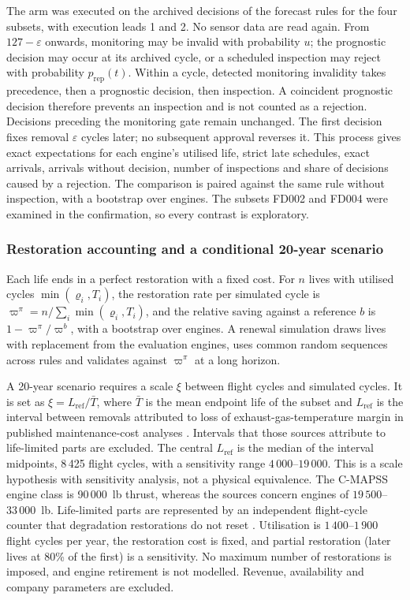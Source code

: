 \documentclass[preprint,12pt]{elsarticle}
\begin{document}
The arm was executed on the archived decisions of the forecast rules for the four subsets, with execution leads 1 and 2. No sensor data are read again. From $127-\varepsilon$ onwards, monitoring may be invalid with probability $u$; the prognostic decision may occur at its archived cycle, or a scheduled inspection may reject with probability $p_{\mathrm{rep}}(t)$. Within a cycle, detected monitoring invalidity takes precedence, then a prognostic decision, then inspection. A coincident prognostic decision therefore prevents an inspection and is not counted as a rejection. Decisions preceding the monitoring gate remain unchanged. The first decision fixes removal $\varepsilon$ cycles later; no subsequent approval reverses it. This process gives exact expectations for each engine's utilised life, strict late schedules, exact arrivals, arrivals without decision, number of inspections and share of decisions caused by a rejection. The comparison is paired against the same rule without inspection, with a bootstrap over engines. The subsets FD002 and FD004 were examined in the confirmation, so every contrast is exploratory.

\subsubsection{Restoration accounting and a conditional 20-year scenario}\label{sec:renewal-method}

Each life ends in a perfect restoration with a fixed cost. For $n$ lives with utilised cycles $\min(\varrho_i,T_i)$, the restoration rate per simulated cycle is $\varpi^{\pi}=n/\sum_i\min(\varrho_i,T_i)$, and the relative saving against a reference $b$ is $1-\varpi^{\pi}/\varpi^{b}$, with a bootstrap over engines. A renewal simulation draws lives with replacement from the evaluation engines, uses common random sequences across rules and validates against $\varpi^{\pi}$ at a long horizon.

A 20-year scenario requires a scale $\xi$ between flight cycles and simulated cycles. It is set as $\xi=L_{\mathrm{ref}}/\bar T$, where $\bar T$ is the mean endpoint life of the subset and $L_{\mathrm{ref}}$ is the interval between removals attributed to loss of exhaust-gas-temperature margin in published maintenance-cost analyses \cite{AC2003,AC2005,AC2019}. Intervals that those sources attribute to life-limited parts are excluded. The central $L_{\mathrm{ref}}$ is the median of the interval midpoints, 8\,425 flight cycles, with a sensitivity range $4\,000$--$19\,000$. This is a scale hypothesis with sensitivity analysis, not a physical equivalence. The C-MAPSS engine class is 90\,000~lb thrust, whereas the sources concern engines of $19\,500$--$33\,000$~lb. Life-limited parts are represented by an independent flight-cycle counter that degradation restorations do not reset \cite{AC33701}. Utilisation is $1\,400$--$1\,900$ flight cycles per year, the restoration cost is fixed, and partial restoration (later lives at 80\% of the first) is a sensitivity. No maximum number of restorations is imposed, and engine retirement is not modelled. Revenue, availability and company parameters are excluded.
\end{document}
